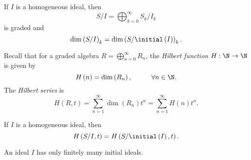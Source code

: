 \documentclass[co439]{subfiles}
\begin{document}
    \begin{cor}{}
        If $I$ is a homogeneous ideal, then
        \begin{equation*}
            S /I = \bigoplus^{\infty}_{k=0} S_k /I_k
        \end{equation*}
        is graded and
        \begin{equation*}
            \dim\left( S /I \right)_k = \dim\left( S /\initial\left( I \right) \right)_k.
        \end{equation*}
    \end{cor}	
    
    \rruleline
    
    \np Recall that for a graded algebra $R = \bigoplus^{\infty}_{n=0} R_n$, the \emph{Hilbert function} $H:\N\to\N$ is given by
    \begin{equation*}
        H\left( n \right) = \dim\left( R_n \right),\hspace{1cm}\forall n\in\N.
    \end{equation*}
    The \emph{Hilbert series} is
    \begin{equation*}
        H\left( R,t \right) = \sum^{\infty}_{n=1}\dim\left( R_n \right)t^n = \sum^{\infty}_{n=1}H\left( n \right)t^n.
    \end{equation*}
    
    \begin{cor}{}
        If $I$ is a homogeneous ideal, then
        \begin{equation*}
            H\left( S /I, t \right) = H\left( S /\initial\left( I \right), t \right).
        \end{equation*}
    \end{cor}	
    
    \rruleline
    
    \begin{theorem}{}
        An ideal $I$ has only finitely many initial ideals.
    \end{theorem}
    
\end{document}
